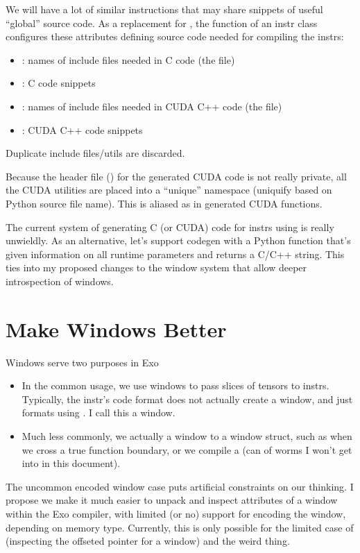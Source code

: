 \filbreak
{}

We will have a lot of similar instructions that may share snippets of useful ``global'' source code.
As a replacement for , the  function of an instr class configures these attributes defining source code needed for compiling the instrs:
\begin{itemize}
\item {}: names of include files needed in C code (the  file)
\item {}: C code snippets
\item {}: names of include files needed in CUDA C++ code (the  file)
\item {}: CUDA C++ code snippets
\end{itemize}
Duplicate include files/utils are discarded.

\filbreak
Because the header file () for the generated CUDA code is not really private, all the CUDA utilities are placed into a ``unique'' namespace (uniquify based on Python source file name).
This is aliased as  in generated CUDA functions.

\filbreak
{}

The current system of generating C (or CUDA) code for instrs using  is really unwieldly.
As an alternative, let's support codegen with a Python function that's given information on all runtime parameters and returns a C/C++ string.
This ties into my proposed changes to the window system that allow deeper introspection of windows.

\newpage
\section{Make Windows Better}
\label{ch:Windows}

Windows serve two purposes in Exo
\begin{itemize}
 \item In the common usage, we use windows to pass slices of tensors to instrs.
 Typically, the instr's code format does not actually create a window, and just formats using .
 I call this a  window.
 \item Much less commonly, we actually  a window to a window struct, such as when we cross a true function boundary, or we compile a  (can of worms I won't get into in this document).
\end{itemize}
\filbreak
The uncommon encoded window case puts artificial constraints on our thinking.
I propose we make it much easier to unpack and inspect attributes of a window within the Exo compiler, with limited (or no) support for encoding the window, depending on memory type.
Currently, this is only possible for the limited case of  (inspecting the offseted pointer for a window) and the weird  thing.

